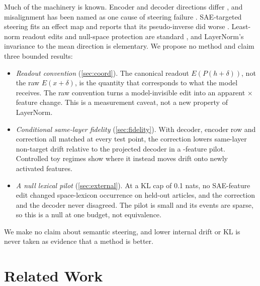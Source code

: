 \documentclass{article}
\theoremstyle{plain}
\theoremstyle{definition}
\theoremstyle{remark}
\begin{document}
Much of the machinery is known. Encoder and decoder directions differ
\citep{chanin2025absorption,oneill2025compute}, and misalignment has been named as one cause
of steering failure \citep{luo2026learning}. SAE-targeted steering fits an effect map and
reports that its pseudo-inverse did worse \citep{chalnev2024improving}. Least-norm readout
edits and null-space protection are standard
\citep{geiger2024finding,wu2024reft,fang2025alphaedit,cui2026sae}, and LayerNorm's
invariance to the mean direction is elementary. We propose no method and claim three
bounded results:
\begin{itemize}
  \item \emph{Readout convention} (\cref{sec:coord}). The canonical readout
  $E(P(h+\delta))$, not the raw $E(x+\delta)$, is the quantity that corresponds to what the
  model receives. The raw convention turns a model-invisible edit into an apparent
  \ClRawMed$\times$ feature change. This is a measurement caveat, not a new property of
  LayerNorm.
  \item \emph{Conditional same-layer fidelity} (\cref{sec:fidelity}). With decoder, encoder
  row and correction all matched at every test point, the correction lowers same-layer
  non-target drift relative to the projected decoder in a \PilotFeatures-feature pilot.
  Controlled toy regimes show where it instead moves drift onto newly activated features.
  \item \emph{A null lexical pilot} (\cref{sec:external}). At a KL cap of 0.1 nats, no
  SAE-feature edit changed space-lexicon occurrence on \SpDocs{} held-out articles, and the
  correction and the decoder never disagreed. The pilot is small and its events are sparse,
  so this is a null at one budget, not equivalence.
\end{itemize}
We make no claim about semantic steering, and lower internal drift or KL is never taken as
evidence that a method is better.

\section{Related Work}
\label{sec:related}
\end{document}
